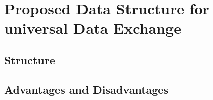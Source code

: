 \chapter{Proposed Data Structure for universal Data Exchange}
\section{Structure}
\section{Advantages and Disadvantages}